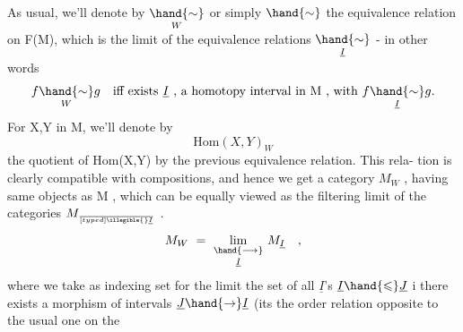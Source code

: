 As usual, we'll denote by $\underset{W}{\hand{\sim}}$ or simply $\hand{\sim}$ the equivalence relation
on F(M), which is the limit  of the equivalence relations $\underset{\underline{I}}{\hand{\sim}}$ - in
other words
\[ f\underset{W}{\hand{\sim}}g \quad \text{iff exists } \underline{I}\text{ , a homotopy interval in M , with } f\underset{\underline{I}}{\hand{\sim}}g. \]
For X,Y in M, we'll denote by 
\[ \mathrm{Hom}(X,Y)_W \]
the quotient of Hom(X,Y) by the previous equivalence relation. This rela-%
tion is clearly compatible with compositions, and hence we get a category
$M_W$ , having same objects as M , which can be equally viewed as the 
filtering limit of the categories $M_{\over[typed]{\illegible{}}{\underline{I}}}$ .
\[ M_W \ = \ \underset{\underline{I}}{\underset{\hand{\longrightarrow}}{\mathrm{lim}}} \ M_{\underline{I}} \quad , \]
where we  \xout{\illegible{}} take as indexing set for the limit the  set of all $\underline{I}$'s\hand{,}
  $\underline{I}\hand{\leqslant}\underline{J}$ i there exists a morphism of
intervals $\underline{J}\hand{\to}\underline{I}$ (its the order relation opposite to the usual one on the

